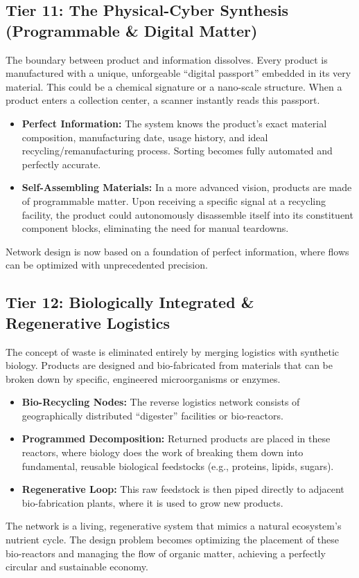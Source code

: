 \documentclass{article}
\begin{document}
\subsection{Tier 11: The Physical-Cyber Synthesis (Programmable \& Digital Matter)}
The boundary between product and information dissolves. Every product is manufactured with a unique, unforgeable ``digital passport'' embedded in its very material. This could be a chemical signature or a nano-scale structure. When a product enters a collection center, a scanner instantly reads this passport.
\begin{itemize}
    \item \textbf{Perfect Information:} The system knows the product's exact material composition, manufacturing date, usage history, and ideal recycling/remanufacturing process. Sorting becomes fully automated and perfectly accurate.
    \item \textbf{Self-Assembling Materials:} In a more advanced vision, products are made of programmable matter. Upon receiving a specific signal at a recycling facility, the product could autonomously disassemble itself into its constituent component blocks, eliminating the need for manual teardowns.
\end{itemize}
Network design is now based on a foundation of perfect information, where flows can be optimized with unprecedented precision.

\subsection{Tier 12: Biologically Integrated \& Regenerative Logistics}
The concept of waste is eliminated entirely by merging logistics with synthetic biology. Products are designed and bio-fabricated from materials that can be broken down by specific, engineered microorganisms or enzymes.
\begin{itemize}
    \item \textbf{Bio-Recycling Nodes:} The reverse logistics network consists of geographically distributed ``digester'' facilities or bio-reactors.
    \item \textbf{Programmed Decomposition:} Returned products are placed in these reactors, where biology does the work of breaking them down into fundamental, reusable biological feedstocks (e.g., proteins, lipids, sugars).
    \item \textbf{Regenerative Loop:} This raw feedstock is then piped directly to adjacent bio-fabrication plants, where it is used to grow new products.
\end{itemize}
The network is a living, regenerative system that mimics a natural ecosystem's nutrient cycle. The design problem becomes optimizing the placement of these bio-reactors and managing the flow of organic matter, achieving a perfectly circular and sustainable economy.
\end{document}
